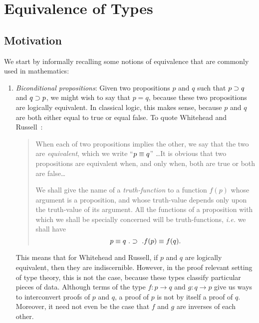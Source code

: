 \documentclass[12pt]{article}
\begin{document}
\section{Equivalence of Types}

\subsection{Motivation}

We start by informally recalling some notions of equivalence that are commonly
used in mathematics:

\begin{enumerate}

\item \emph{Biconditional propositions}: Given two propositions $p$ and $q$
such that $p \supset q$ and $q \supset p$, we might wish to say that $p = q$,
because these two propositions are logically equivalent. In classical logic,
this makes sense, because $p$ and $q$ are both either equal to true or equal
false. To quote Whitehead and Russell~\cite[p.115]{Whitehead63}:

\begin{quotation}

When each of two propositions implies the other, we say that the two are
\emph{equivalent}, which we write ``$p \equiv q$'' \dots It is obvious that two
propositions are equivalent when, and only when, both are true or both are
false\dots

We shall give the name of a \emph{truth-function} to a function
$f(p)$ whose argument is a proposition, and whose truth-value
depends only upon the truth-value of its argument. All the functions
of a proposition with which we shall be specially concerned will be
truth-functions, \emph{i.e.} we shall have
%
\begin{equation*}
p \equiv q \ . \supset \ . f(p) \equiv f(q) . 
\end{equation*}
%
\end{quotation}

This means that for Whitehead and Russell, if $p$ and $q$ are logically
equivalent, then they are indiscernible. However, in the proof relevant setting
of type theory, this is not the case, because these types classify particular
pieces of data.  Although terms of the type $f : p \to q$ and $g : q \to p$
give us ways to interconvert proofs of $p$ and $q$, a proof of $p$ is not by
itself a proof of $q$.  Moreover, it need not even be the case that $f$ and $g$
are inverses of each other.


\end{enumerate}
\end{document}
